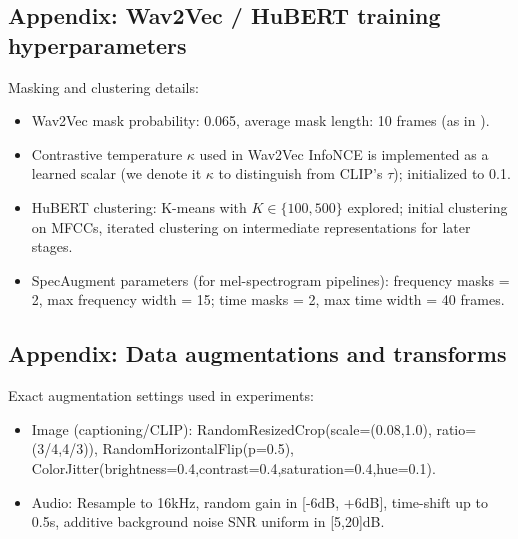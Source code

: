 \documentclass[conference]{IEEEtran}
\begin{document}
\subsection{Appendix: Wav2Vec / HuBERT training hyperparameters}\label{appendix:audiohp}
Masking and clustering details:
\begin{itemize}
  \item Wav2Vec mask probability: 0.065, average mask length: 10 frames (as in \cite{baevski2020wav2vec}).
  \item Contrastive temperature \(\kappa\) used in Wav2Vec InfoNCE is implemented as a learned scalar (we denote it \(\kappa\) to distinguish from CLIP's \(\tau\)); initialized to 0.1.
  \item HuBERT clustering: K-means with \(K\in\{100,500\}\) explored; initial clustering on MFCCs, iterated clustering on intermediate representations for later stages.
  \item SpecAugment parameters (for mel-spectrogram pipelines): frequency masks = 2, max frequency width = 15; time masks = 2, max time width = 40 frames.
\end{itemize}

\subsection{Appendix: Data augmentations and transforms}\label{appendix:aug}
Exact augmentation settings used in experiments:
\begin{itemize}
  \item Image (captioning/CLIP): RandomResizedCrop(scale=(0.08,1.0), ratio=(3/4,4/3)), RandomHorizontalFlip(p=0.5), ColorJitter(brightness=0.4,contrast=0.4,saturation=0.4,hue=0.1).
  \item Audio: Resample to 16kHz, random gain in [-6dB, +6dB], time-shift up to 0.5s, additive background noise SNR uniform in [5,20]dB.
\end{itemize}
\end{document}
